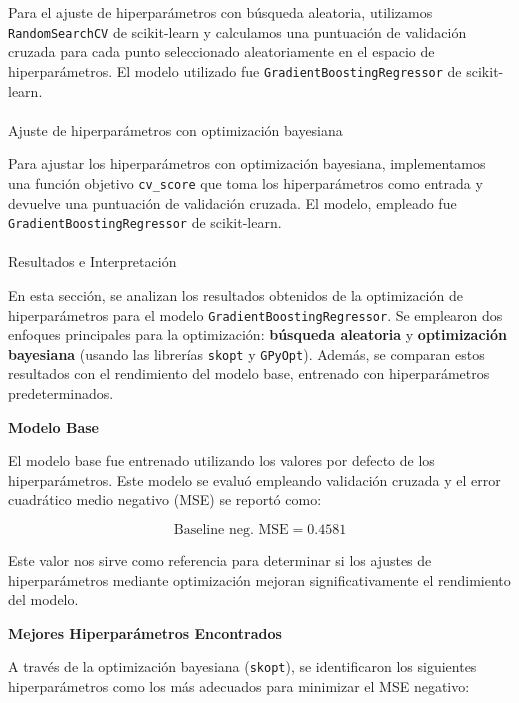 \documentclass[
  12pt,
  letterpaper,
  DIV=11,
  numbers=noendperiod]{scrartcl}
\makeatletter
\let\oldparagraph\paragraph
\renewcommand{\paragraph}{
    \@ifstar
      \xxxParagraphStar
      \xxxParagraphNoStar
  }
\newcommand{\xxxParagraphStar}[1]{\oldparagraph*{#1}\mbox{}}
\newcommand{\xxxParagraphNoStar}[1]{\oldparagraph{#1}\mbox{}}
\makeatother
\begin{document}
Para el ajuste de hiperparámetros con búsqueda aleatoria, utilizamos
\texttt{RandomSearchCV} de scikit-learn y calculamos una puntuación de
validación cruzada para cada punto seleccionado aleatoriamente en el
espacio de hiperparámetros. El modelo utilizado fue
\texttt{GradientBoostingRegressor} de scikit-learn.

\paragraph{Ajuste de hiperparámetros con optimización
bayesiana}\label{ajuste-de-hiperparuxe1metros-con-optimizaciuxf3n-bayesiana-1}

Para ajustar los hiperparámetros con optimización bayesiana,
implementamos una función objetivo \texttt{cv\_score} que toma los
hiperparámetros como entrada y devuelve una puntuación de validación
cruzada. El modelo, empleado fue \texttt{GradientBoostingRegressor} de
scikit-learn.

\paragraph{Resultados e
Interpretación}\label{resultados-e-interpretaciuxf3n-1}

En esta sección, se analizan los resultados obtenidos de la optimización
de hiperparámetros para el modelo \texttt{GradientBoostingRegressor}. Se
emplearon dos enfoques principales para la optimización:
\textbf{búsqueda aleatoria} y \textbf{optimización bayesiana} (usando
las librerías \texttt{skopt} y \texttt{GPyOpt}). Además, se comparan
estos resultados con el rendimiento del modelo base, entrenado con
hiperparámetros predeterminados.

\textbf{Modelo Base}

El modelo base fue entrenado utilizando los valores por defecto de los
hiperparámetros. Este modelo se evaluó empleando validación cruzada y el
error cuadrático medio negativo (MSE) se reportó como:

\[
\text{Baseline neg. MSE} = 0.4581
\]

Este valor nos sirve como referencia para determinar si los ajustes de
hiperparámetros mediante optimización mejoran significativamente el
rendimiento del modelo.

\textbf{Mejores Hiperparámetros Encontrados}

A través de la optimización bayesiana (\texttt{skopt}), se identificaron
los siguientes hiperparámetros como los más adecuados para minimizar el
MSE negativo:
\end{document}
